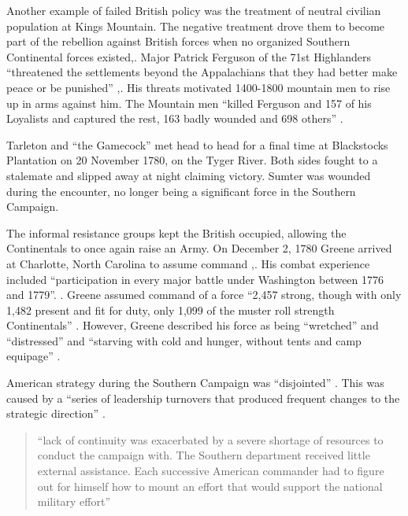 Another example of failed British policy was the treatment of neutral civilian
population at Kings Mountain. The negative treatment drove them to become part
of the rebellion against British forces when no organized Southern Continental
forces existed,.  Major Patrick Ferguson of the 71st Highlanders ``threatened
the settlements beyond the Appalachians that they had better make peace or be
punished'' \cite[24]{weigley_partisan_1970},\cite[22]{moncure_cowpens_1996}.
His threats motivated 1400-1800 mountain men to rise up in arms against him.
The Mountain men ``killed Ferguson and 157 of his Loyalists and captured the
rest, 163 badly wounded and 698 others'' \cite[25]{weigley_partisan_1970}. 

Tarleton and ``the Gamecock'' met head to head for a final time at Blackstocks
Plantation on 20 November 1780, on the Tyger River.  Both sides fought to a
stalemate and slipped away at night claiming victory.  Sumter was wounded
during the encounter, no longer being a significant force in the Southern
Campaign. 

The informal resistance groups kept the British occupied, allowing the
Continentals to once again raise an Army.  On December 2, 1780 Greene arrived
at Charlotte, North Carolina to assume command
\cite[22]{moncure_cowpens_1996},\cite[25]{weigley_partisan_1970}.  His combat
experience included ``participation in every major battle under Washington
between 1776 and 1779''. \cite[5]{babits_devil_2001}.  Greene assumed command
of a force ``2,457 strong, though with only 1,482 present and fit for duty,
only 1,099 of the muster roll strength Continentals''
\cite[27]{weigley_partisan_1970}.   However, Greene described his force as
being ``wretched'' and ``distressed'' and ``starving with cold and hunger,
without tents and camp equipage'' \cite[23]{moncure_cowpens_1996}.

American strategy during the Southern Campaign was ``disjointed''
\cite[60]{woodward_comparative_2002}. This was caused by a ``series of
leadership turnovers that produced frequent changes to the strategic
direction'' \cite[61]{woodward_comparative_2002}.

\begin{quote}
``lack of continuity was exacerbated by a severe shortage of resources to
conduct the campaign with.  The Southern department received little external
assistance.  Each successive American commander had to figure out for himself
how to mount an effort that would support the national military effort''
\cite[61]{woodward_comparative_2002}
\end{quote}

